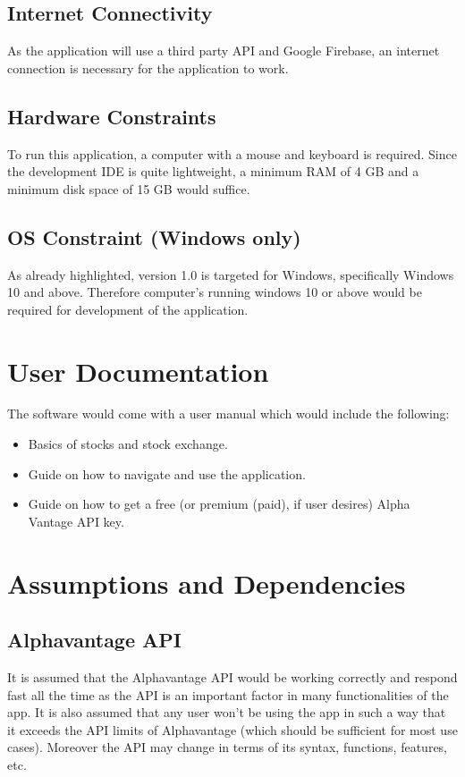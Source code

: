 \documentclass[12 pt, a4paper]{report}
\begin{document}
	\subsection{Internet Connectivity}
	As the application will use a third party API and Google Firebase, an internet connection is necessary for the application to work.
	
	\subsection{Hardware Constraints}
	To run this application, a computer with a mouse and keyboard is required. Since the development IDE is quite lightweight, a minimum RAM of 4 GB and a minimum disk space of 15 GB would suffice.
	
	\subsection{OS Constraint (Windows only)}
	As already highlighted, version 1.0 is targeted for Windows, specifically Windows 10 and above. Therefore computer's running windows 10 or above would be required for development of the application.

	
	\section {User Documentation}
	
	The software would come with a user manual which would include the following:
	\begin{itemize}
		\item Basics of stocks and stock exchange.
		\item Guide on how to navigate and use the application.
		\item Guide on how to get a free (or premium (paid), if user desires) Alpha Vantage API key.
	\end{itemize}
	
	\section {Assumptions and Dependencies}
	
	\subsection{Alphavantage API}
	It is assumed that the Alphavantage API would be working correctly and respond fast all the time as the API is an important factor in many functionalities of the app. It is also assumed that any user won't be using the app in such a way that it exceeds the API limits of Alphavantage (which should be sufficient for most use cases). Moreover the API may change in terms of its syntax, functions, features, etc.
\end{document}
